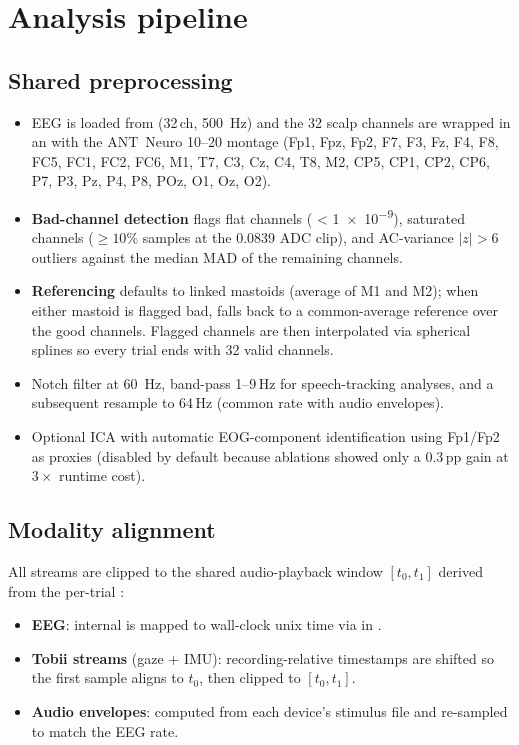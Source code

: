 \chapter{Analysis pipeline}
\label{ch:pipeline}

\section{Shared preprocessing}

\begin{itemize}
  \item EEG is loaded from  (32\,ch, \SI{500}{\Hz}) and the
        32 scalp channels are wrapped in an  with the
        ANT~Neuro 10--20 montage (Fp1, Fpz, Fp2, F7, F3, Fz, F4, F8, FC5,
        FC1, FC2, FC6, M1, T7, C3, Cz, C4, T8, M2, CP5, CP1, CP2, CP6, P7,
        P3, Pz, P4, P8, POz, O1, Oz, O2).
  \item \textbf{Bad-channel detection} flags flat channels
        ( < \num{1e-9}), saturated channels ($\geq 10\%$ samples at
        the \num{0.0839} ADC clip), and AC-variance $|z| > 6$ outliers
        against the median MAD of the remaining channels.
  \item \textbf{Referencing} defaults to linked mastoids (average of
        M1 and M2); when either mastoid is flagged bad, falls back to a
        common-average reference over the good channels. Flagged channels
        are then interpolated via spherical splines so every trial ends with
        32 valid channels.
  \item Notch filter at \SI{60}{\Hz}, band-pass 1--9\,Hz for speech-tracking
        analyses, and a subsequent resample to 64\,Hz (common rate with
        audio envelopes).
  \item Optional ICA with automatic EOG-component identification using
        Fp1/Fp2 as proxies (disabled by default because ablations showed
        only a \num{0.3}\,pp gain at $3\times$ runtime cost).
\end{itemize}

\section{Modality alignment}

All streams are clipped to the shared audio-playback window
$[t_0, t_1]$ derived from the per-trial :

\begin{itemize}
  \item \textbf{EEG}: internal  is mapped to wall-clock unix
        time via  in .
  \item \textbf{Tobii streams} (gaze + IMU): recording-relative timestamps
        are shifted so the first sample aligns to $t_0$, then clipped to
        $[t_0, t_1]$.
  \item \textbf{Audio envelopes}: computed from each device's stimulus file
        and re-sampled to match the EEG rate.
\end{itemize}

